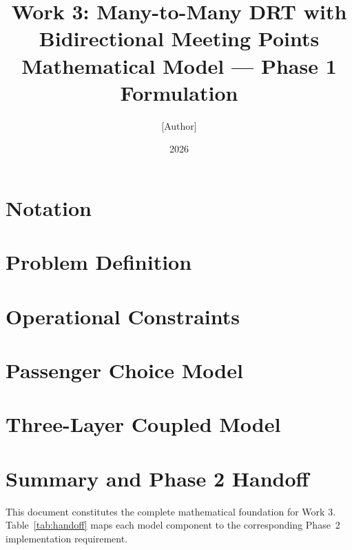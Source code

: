 \documentclass[12pt, a4paper]{article}
\title{Work 3: Many-to-Many DRT with Bidirectional Meeting Points\\
       \large Mathematical Model --- Phase 1 Formulation}
\author{[Author]}
\date{2026}
\begin{document}
\maketitle
\tableofcontents
\newpage

\section{Notation}\label{sec:notation}


\section{Problem Definition}\label{sec:problem}


\section{Operational Constraints}\label{sec:constraints}


\section{Passenger Choice Model}\label{sec:choice}


\section{Three-Layer Coupled Model}\label{sec:model}


\section{Summary and Phase 2 Handoff}\label{sec:handoff}

This document constitutes the complete mathematical foundation for Work 3.
Table~\ref{tab:handoff} maps each model component to the corresponding Phase~2
implementation requirement.
\end{document}

